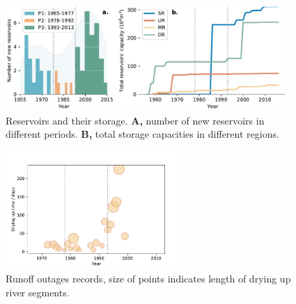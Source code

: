 \documentclass[9pt,twoside,lineno]{pnas-new}
\begin{document}
\begin{figure}
    \centering
    \includegraphics[width=0.95\textwidth]{../../figures/sup/reservoirs.pdf}
    \caption{
        Reservoirs and their storage.
        \textbf{A,} number of new reservoirs in different periods.
        \textbf{B,} total storage capacities in different regions. 
    }
\end{figure}



\begin{figure}
    \centering
    \includegraphics[width=0.6\textwidth]{../../figures/sup/outages.pdf}
    \caption{Runoff outages records, size of points indicates length of drying up river segments.}
\end{figure}
\end{document}
